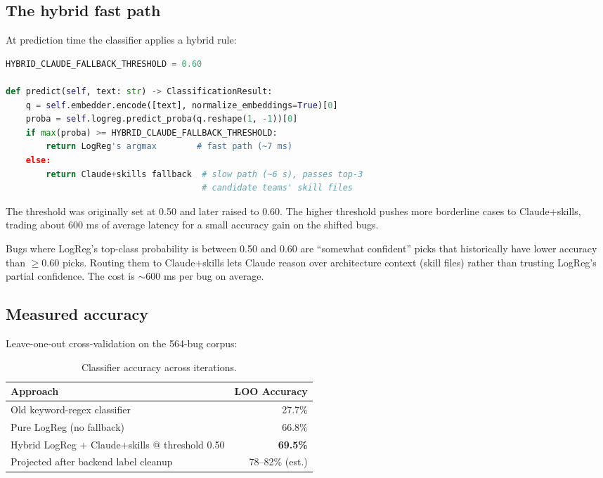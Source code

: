 \documentclass[11pt,a4paper]{article}
\begin{document}
\subsection{The hybrid fast path}

At prediction time the classifier applies a hybrid rule:

\begin{lstlisting}[language=python]
HYBRID_CLAUDE_FALLBACK_THRESHOLD = 0.60

def predict(self, text: str) -> ClassificationResult:
    q = self.embedder.encode([text], normalize_embeddings=True)[0]
    proba = self.logreg.predict_proba(q.reshape(1, -1))[0]
    if max(proba) >= HYBRID_CLAUDE_FALLBACK_THRESHOLD:
        return LogReg's argmax        # fast path (~7 ms)
    else:
        return Claude+skills fallback  # slow path (~6 s), passes top-3
                                       # candidate teams' skill files
\end{lstlisting}

The threshold was originally set at 0.50 and later raised to 0.60. The
higher threshold pushes more borderline cases to Claude+skills, trading
about 600 ms of average latency for a small accuracy gain on the shifted
bugs.

\begin{decisionbox}
Bugs where LogReg's top-class probability is between 0.50 and 0.60 are
``somewhat confident'' picks that historically have lower accuracy than
$\geq 0.60$ picks. Routing them to Claude+skills lets Claude reason
over architecture context (skill files) rather than trusting LogReg's
partial confidence. The cost is $\sim$600 ms per bug on average.
\end{decisionbox}

\subsection{Measured accuracy}

Leave-one-out cross-validation on the 564-bug corpus:

\begin{table}[h]
\centering
\small
\begin{tabular}{lr}
\toprule
\textbf{Approach} & \textbf{LOO Accuracy} \\
\midrule
Old keyword-regex classifier                & 27.7\% \\
Pure LogReg (no fallback)                   & 66.8\% \\
Hybrid LogReg + Claude+skills @ threshold 0.50 & \textbf{69.5\%} \\
Projected after backend label cleanup       & 78--82\% (est.) \\
\bottomrule
\end{tabular}
\caption{Classifier accuracy across iterations.}
\end{table}
\end{document}
